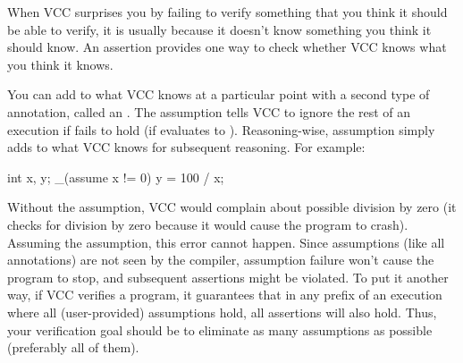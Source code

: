 When VCC surprises you by failing to verify something that you think
it should be able to verify, it is usually because it doesn't know
something you think it should know. An assertion provides one way to
check whether VCC knows what you think it knows.

You can add to what VCC knows at a particular point with a second
type of annotation, called an .
The assumption  tells VCC to ignore
the rest of an execution if  fails to hold (\ie if
 evaluates to ). 
Reasoning-wise, assumption simply adds  to what VCC
knows for subsequent reasoning. For example:
\begin{VCC}
int x, y;
_(assume x != 0)
y = 100 / x;
\end{VCC}
Without the assumption, VCC would complain about possible division by
zero (it checks for division by zero because it would cause the
program to crash).  Assuming the assumption, this error cannot happen.  
Since assumptions (like all annotations) are not seen by the compiler,
assumption failure won't cause the program to stop, and subsequent assertions
might be violated. To put it another way, if VCC verifies a program,
it guarantees that in any prefix of an execution
where all (user-provided) assumptions hold, all assertions will also
hold. Thus, your verification goal should be to eliminate as many assumptions as
possible (preferably all of them).

